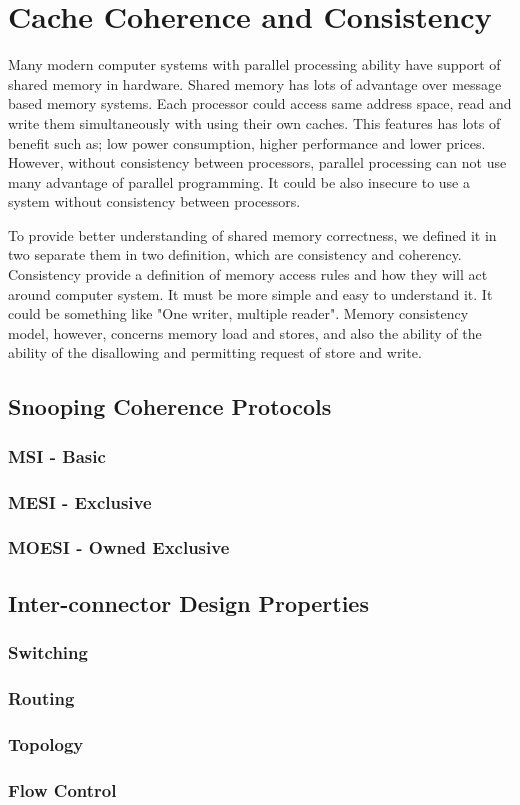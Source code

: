 \documentclass[informationsecurity]{gucmasterproject}
\begin{document}
\section{Cache Coherence and  Consistency}
Many modern computer systems with parallel processing ability have support of shared memory in hardware. Shared memory has lots of advantage over message based memory systems.  Each processor could access same address space, read and write them simultaneously with using their own caches. This features has lots of benefit such as; low power consumption, higher performance and lower prices. However, without consistency between processors, parallel processing can not use many advantage of parallel programming. It could be also insecure to use a system without consistency between processors. 

To provide better understanding of shared memory correctness, we defined it in two separate them in two definition, which are consistency and coherency. Consistency provide a definition of memory access rules and how they will act around computer system. It must be more simple and easy to understand it. It could be something like "One writer, multiple reader". Memory consistency model, however, concerns memory load and stores, and also the ability of the ability of the disallowing and permitting request of store and write.
\subsection{Snooping Coherence Protocols}
\subsubsection{MSI - Basic}
\subsubsection{MESI - Exclusive}
\subsubsection{MOESI - Owned Exclusive}
\subsection{Inter-connector Design Properties}
\subsubsection{Switching}
\subsubsection{Routing}
\subsubsection{Topology}
\subsubsection{Flow Control}


\end{document}
